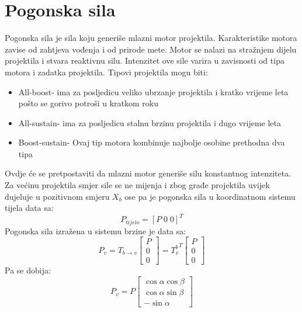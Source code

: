 \section{Pogonska sila}
Pogonska sila je sila koju generiše mlazni motor projektila. Karakteristike motora zavise 
od zahtjeva vođenja i od prirode mete. Motor se nalazi na stražnjem dijelu projektila i stvara reaktivnu 
silu. Intenzitet ove sile varira u zavisnosti od tipa motora i zadatka projektila. Tipovi projektila mogu biti:
\begin{itemize}
    \item All-boost- ima za posljedicu veliko ubrzanje projektila i kratko vrijeme leta pošto se gorivo potroši u kratkom roku
    \item All-sustain- ima za posljedicu stalnu brzinu projektila i dugo vrijeme leta
    \item Boost-sustain- Ovaj tip motora kombinuje najbolje osobine prethodna dva tipa
\end{itemize}
Ovdje će se pretpostaviti da mlazni motor generiše silu konstantnog intenziteta. Za većinu 
projektila smjer sile se ne mijenja i zbog građe projektila uvijek dujeluje u pozitivnom smjeru 
$X_b$ ose pa je pogonska sila u koordinatnom sistemu tijela data sa:
\begin{equation}
    P_{tijelo}=[P\;  0\;  0]^T
\end{equation}
Pogonska sila izražena u sistemu brzine je data sa:
\begin{equation}
    P_v = T_{b\to v}\begin{bmatrix}
        P \\ 0 \\ 0
    \end{bmatrix} = {T_{v}^b}^T\begin{bmatrix}
        P \\ 0 \\ 0
    \end{bmatrix}
\end{equation}
Pa se dobija:
\begin{equation}
    P_v=P\begin{bmatrix}
        \cos\alpha\cos\beta \\ \cos\alpha\sin\beta \\ -\sin\alpha
    \end{bmatrix}
\end{equation}
